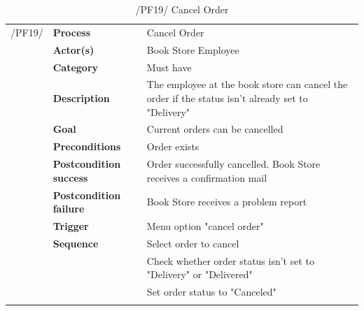\documentclass[11pt,a4paper,oneside,svgnames]{report}
\begin{document}
\begin{table}[H]
\centering
\begin{tabular}{p{1.5cm}p{3cm}p{8cm}}
\cellcolor{white}/PF19/	& \textbf{Process} & Cancel Order\\
\cellcolor{white}		& \textbf{Actor(s)} & Book Store Employee\\
\cellcolor{white}		& \textbf{Category} & Must have\\
\cellcolor{white}		& \textbf{Description}	 & The employee at the book store can cancel the order if the status isn't already set to "Delivery"\\
\cellcolor{white}		& \textbf{Goal} & Current orders can be cancelled\\
\cellcolor{white}		& \textbf{Preconditions} & Order exists\\
\cellcolor{white}		& \textbf{Postcondition success} & Order successfully cancelled. Book Store receives a confirmation mail\\
\cellcolor{white}		& \textbf{Postcondition failure} & Book Store receives a problem report\\
\cellcolor{white}		& \textbf{Trigger} & Menu option "cancel order"\\
\cellcolor{white}		& \textbf{Sequence} & Select order to cancel\\
\cellcolor{white}		& & Check whether order status isn't set to "Delivery" or "Delivered"\\
\cellcolor{white}		& & Set order status to "Canceled"\\
\cellcolor{white}\hfill \\
\end{tabular}
\caption{/PF19/ Cancel Order}
\label{tab:pf19}
\end{table}
\end{document}
